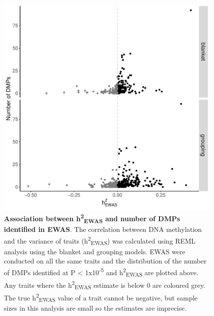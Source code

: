\documentclass[11pt,oneside]{bristolthesis}
\begin{document}
\begin{figure}

{\centering \includegraphics[width=1\linewidth]{figure/05-h2ewas/m2_hit_count_scatter_p5_test} 

}

\caption[Association between h\textsuperscript{2}\textsubscript{EWAS} and number of DMPs identified in EWAS]{\textbf{Association between h\textsuperscript{2}\textsubscript{EWAS} and number of DMPs identified in EWAS}. The correlation between DNA methylation and the variance of traits (h\textsuperscript{2}\textsubscript{EWAS}) was calculated using REML analysis using the blanket and grouping models. EWAS were conducted on all the same traits and the distribution of the number of DMPs identified at P \textless{} 1x10\textsuperscript{-5} and h\textsuperscript{2}\textsubscript{EWAS} are plotted above. Any traits where the h\textsuperscript{2}\textsubscript{EWAS} estimate is below 0 are coloured grey. The true h\textsuperscript{2}\textsubscript{EWAS} value of a trait cannot be negative, but sample sizes in this analysis are small so the estimates are imprecise.}\label{fig:dmps-and-h2ewas}
\end{figure}
\end{document}
